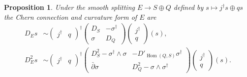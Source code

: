 \documentclass[10pt,a4paper]{amsart}
\newtheorem{prop}[theo]{Proposition}
\theoremstyle{definition}
\DeclareMathOperator{\Hom}{Hom}
\def\snd{\sigma}
\begin{document}
\begin{prop}
Under the smooth splitting $E \to S \oplus Q$ defined by $s \mapsto j^\dagger s \oplus qs$ the Chern connection and curvature form of $E$ are
\begin{align*}
D_E s &\sim
\begin{pmatrix}
j^\dagger & q
\end{pmatrix}^\dagger
\begin{pmatrix}
D_S & - \snd^\dagger
\\
\snd & D_Q
\end{pmatrix}
\begin{pmatrix}
j^\dagger \\ q
\end{pmatrix}
(s),
\\
D_E^2 s &\sim
\begin{pmatrix}
j^\dagger & q
\end{pmatrix}^\dagger
\begin{pmatrix}
D^2_S - \snd^\dagger \wedge \snd & -D'_{\Hom(Q,S)} \snd^\dagger
\\
\bar\partial \snd & D^2_Q - \snd \wedge \snd^\dagger
\end{pmatrix}
\begin{pmatrix}
  j^\dagger \\ q
\end{pmatrix}(s).
\end{align*}
\end{prop}
\end{document}
